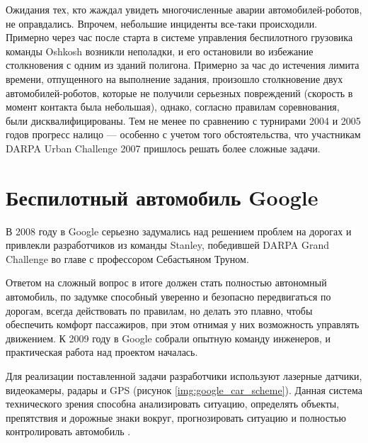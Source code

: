 Ожидания тех, кто жаждал увидеть многочисленные аварии автомобилей-роботов, 
не оправдались. Впрочем, небольшие инциденты все-таки происходили. Примерно 
через час после старта в системе управления беспилотного грузовика команды 
Oshkosh возникли неполадки, и его остановили во избежание столкновения с 
одним из зданий полигона. Примерно за час до истечения лимита времени, 
отпущенного на выполнение задания, произошло столкновение двух 
автомобилей-роботов, которые не получили серьезных повреждений 
(скорость в момент контакта была небольшая), однако, согласно правилам 
соревнования, были дисквалифицированы. Тем не менее по сравнению с турнирами 
2004 и 2005 годов прогресс налицо — особенно с учетом того обстоятельства, что 
участникам DARPA Urban Challenge 2007 пришлось решать более сложные задачи.





\section{Беспилотный автомобиль Google} \label{sect_Google}

В 2008 году в Google серьезно задумались над решением проблем на дорогах и привлекли 
разработчиков из команды Stanley, победившей DARPA Grand Challenge во главе с 
профессором Себастьяном Труном.

Ответом на сложный вопрос в итоге должен стать полностью автономный 
автомобиль, по задумке способный уверенно и безопасно передвигаться по дорогам, 
всегда действовать по правилам, но делать это плавно, чтобы обеспечить комфорт 
пассажиров, при этом отнимая у них возможность управлять движением. К 2009 году 
в Google собрали опытную команду инженеров, и практическая работа над проектом 
началась. 

Для реализации поставленной задачи разработчики используют лазерные датчики, 
видеокамеры, радары и GPS (рисунок \ref{img:google_car_scheme}). 
Данная система технического зрения способна анализировать ситуацию, 
определять объекты, препятствия и дорожные знаки вокруг, прогнозировать 
ситуацию и полностью контролировать автомобиль \cite{MADI_GAZ}.

